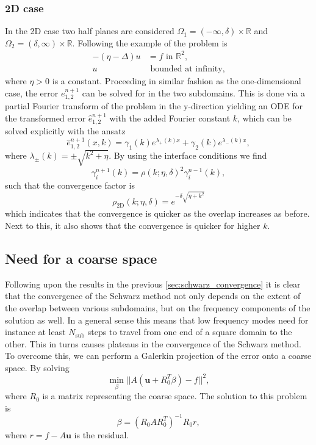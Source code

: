 \subsubsection{2D case}
In the 2D case two half planes are considered $\Omega_1 = (-\infty, \delta)\times \mathbb{R}$ and $\Omega_2 = (\delta, \infty)\times \mathbb{R}$. Following the example of \citeauthor{schwarz_methods_Dolean_2015} the problem is
\begin{align*}
    -(\eta - \Delta) u & = f \text{ in } \mathbb{R}^2, \\
    u                  & \text{ bounded at infinity},
\end{align*}
where $\eta > 0$ is a constant. Proceeding in similar fashion as the one-dimensional case, the error $e^{n+1}_{1,2}$ can be solved for in the two subdomains. This is done via a partial Fourier transform of the problem in the y-direction yielding an ODE for the transformed error $\hat{e}^{n+1}_{1,2}$ with the added Fourier constant $k$, which can be solved explicitly with the ansatz
\[
    \hat{e}^{n+1}_{1,2}(x, k) = \gamma_1(k) e^{\lambda_{+}(k) x} + \gamma_2(k) e^{\lambda_{-}(k) x},
\]
where $\lambda_{\pm}(k) = \pm \sqrt{k^2 + \eta}$. By using the interface conditions we find
\[
    \gamma_{i}^{n+1}(k) = \rho(k;\eta,\delta)^2 \gamma_{i}^{n-1}(k),
\]
such that the convergence factor is \cite[Equation 1.36]{schwarz_methods_Dolean_2015}
\begin{equation}
    \rho_{\text{2D}}(k;\eta,\delta) = e^{-\delta\sqrt{\eta + k^2}}
    \label{eq:2D_Schwarz_convergence}
\end{equation}
which indicates that the convergence is quicker as the overlap increases as before. Next to this, it also shows that the convergence is quicker for higher $k$.

\subsection{Need for a coarse space}
Following upon the results in the previous \cref{sec:schwarz_convergence} it is clear that the convergence of the Schwarz method not only depends on the extent of the overlap between various subdomains, but on the frequency components of the solution as well. In a general sense this means that low frequency modes need for instance at least $N_{\text{sub}}$ steps to travel from one end of a square domain to the other. This in turns causes plateaus in the convergence of the Schwarz method. To overcome this, we can perform a Galerkin projection of the error onto a coarse space. By solving
\[
    \min_{\beta} ||A(\mathbf{u} + R_0^T\beta) - f||^2,
\]
where $R_0$ is a matrix representing the coarse space. The solution to this problem is
\[
    \beta = (R_0 A R_0^T)^{-1} R_0 r,
\]
where $r = f - A \mathbf{u}$ is the residual.

